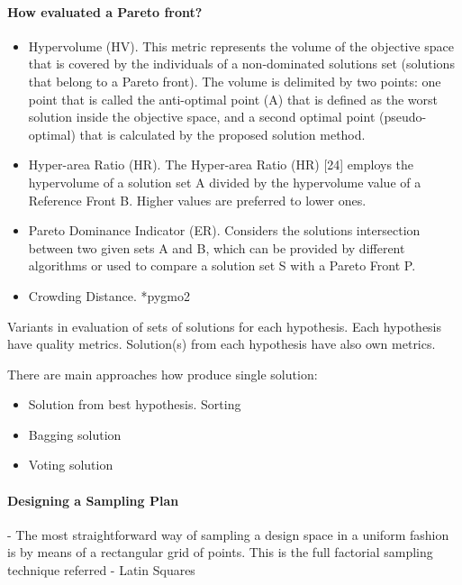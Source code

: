    

    \paragraph{How evaluated a Pareto front?}
    \begin{itemize}
        \item Hypervolume (HV). 
        This metric represents the volume of the objective space
        that is covered by the individuals of a non-dominated
        solutions set (solutions that belong to a Pareto front). The
        volume is delimited by two points: one point that is called
        the anti-optimal point (A) that is defined as the worst
        solution inside the objective space, and a second optimal
        point (pseudo-optimal) that is calculated by the proposed
        solution method. 
        \item Hyper-area Ratio (HR).
        The Hyper-area Ratio (HR) [24] employs the hypervolume of a solution set A
        divided by the hypervolume value of a Reference Front B. Higher values are
        preferred to lower ones.
        \item Pareto Dominance Indicator (ER). 
        Considers the solutions intersection between two given sets A and B, which can be 
        provided by different algorithms or used to compare a solution set S with a Pareto Front P.
        \item Crowding Distance. *pygmo2
        
    \end{itemize}

    Variants in evaluation of sets of solutions for each hypothesis.
    Each hypothesis have quality metrics. Solution(s) from each hypothesis have also own metrics.

    There are main approaches how produce single solution: 
    \begin{itemize}
        \item Solution from best hypothesis. Sorting
        \item Bagging solution
        \item Voting solution                
    \end{itemize}

    \paragraph{Designing a Sampling Plan}
     - The most straightforward way of sampling a design space in a uniform fashion is by \cite{EngSurMod}
     means of a rectangular grid of points. This is the full factorial sampling technique referred
     - Latin Squares